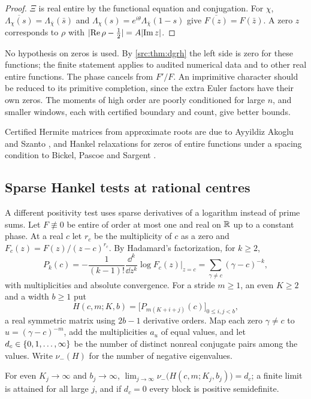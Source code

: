 \begin{proof}
$\Xi$ is real entire by the functional equation and conjugation. For $\chi$,
$\overline{\Lambda_\chi(s)}=\Lambda_{\bar\chi}(\bar s)$ and $\Lambda_\chi(s)=e^{i\theta}\Lambda_{\bar\chi}(1-s)$
give $\overline{F(z)}=F(\bar z)$. A zero $z$ corresponds to $\rho$ with $\lvert\operatorname{Re}\rho-\frac12\rvert=A\lvert\operatorname{Im} z\rvert$.
\end{proof}

No hypothesis on zeros is used. By \cref{src:thm:dgrh} the left side is zero for these functions;
the finite statement applies to audited numerical data and to other real entire functions. The
phase cancels from $F'/F$. An imprimitive character should be reduced to its primitive completion,
since the extra Euler factors have their own zeros. The moments of high order are poorly conditioned
for large $n$, and smaller windows, each with certified boundary and count, give better bounds.

Certified Hermite matrices from approximate roots are due to Ayyildiz Akoglu and Szanto
\cite{AyyildizAkogluSzanto2023Certified}, and Hankel relaxations for zeros of entire functions under
a spacing condition to Bickel, Pascoe and Sargent \cite{BickelPascoeSargent2023Zero}.

\subsection{Sparse Hankel tests at rational centres}\label{ana:sec:hankel}
{\raggedright{}}

A different positivity test uses sparse derivatives of a logarithm instead of prime sums. Let
$F\not\equiv0$ be entire of order at most one and real on $\mathbb{R}$ up to a constant phase. At a
real $c$ let $r_c$ be the multiplicity of $c$ as a zero and $F_c(z)=F(z)/(z-c)^{r_c}$. By
Hadamard's factorization, for $k\ge2$,
\[
 P_k(c)=-\frac1{(k-1)!}\frac{\dd^k}{\dd z^k}\log F_c(z)\Big|_{z=c}=\sum_{\gamma\ne c}(\gamma-c)^{-k},
\]
with multiplicities and absolute convergence. For a stride $m\ge1$, an even $K\ge2$ and a width
$b\ge1$ put
\[
 H(c,m;K,b)=\bigl[P_{m(K+i+j)}(c)\bigr]_{0\le i,j<b},
\]
a real symmetric matrix using $2b-1$ derivative orders. Map each zero $\gamma\ne c$ to
$u=(\gamma-c)^{-m}$, add the multiplicities $a_u$ of equal values, and let
$d_c\in\{0,1,\dots,\infty\}$ be the number of distinct nonreal conjugate pairs among the values.
Write $\nu_-(H)$ for the number of negative eigenvalues.

\begin{theorem}\label{ana:thm:hankel}
For even $K_j\to\infty$ and $b_j\to\infty$,
$\lim_{j\to\infty}\nu_-\bigl(H(c,m;K_j,b_j)\bigr)=d_c$; a finite limit is attained for all large
$j$, and if $d_c=0$ every block is positive semidefinite.
\end{theorem}

